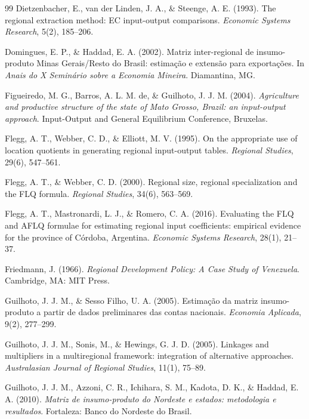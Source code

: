 \documentclass[11pt,a4paper]{article}
\begin{document}
\begin{thebibliography}{99}
Dietzenbacher, E., van der Linden, J. A., \& Steenge, A. E. (1993). The regional extraction
method: EC input-output comparisons. \textit{Economic Systems Research}, 5(2), 185--206.

Domingues, E. P., \& Haddad, E. A. (2002). Matriz inter-regional de insumo-produto
Minas Gerais/Resto do Brasil: estimação e extensão para exportações. In
\textit{Anais do X Seminário sobre a Economia Mineira}. Diamantina, MG.

Figueiredo, M. G., Barros, A. L. M. de, \& Guilhoto, J. J. M. (2004). \textit{Agriculture
and productive structure of the state of Mato Grosso, Brazil: an input-output approach}.
Input-Output and General Equilibrium Conference, Bruxelas.

Flegg, A. T., Webber, C. D., \& Elliott, M. V. (1995). On the appropriate use of location
quotients in generating regional input-output tables. \textit{Regional Studies}, 29(6), 547--561.

Flegg, A. T., \& Webber, C. D. (2000). Regional size, regional specialization and the FLQ
formula. \textit{Regional Studies}, 34(6), 563--569.

Flegg, A. T., Mastronardi, L. J., \& Romero, C. A. (2016). Evaluating the FLQ and AFLQ
formulae for estimating regional input coefficients: empirical evidence for the
province of Córdoba, Argentina. \textit{Economic Systems Research}, 28(1), 21--37.

Friedmann, J. (1966). \textit{Regional Development Policy: A Case Study of Venezuela}.
Cambridge, MA: MIT Press.

Guilhoto, J. J. M., \& Sesso Filho, U. A. (2005). Estimação da matriz
insumo-produto a partir de dados preliminares das contas nacionais.
\textit{Economia Aplicada}, 9(2), 277--299.

Guilhoto, J. J. M., Sonis, M., \& Hewings, G. J. D. (2005). Linkages and multipliers in a
multiregional framework: integration of alternative approaches. \textit{Australasian
Journal of Regional Studies}, 11(1), 75--89.

Guilhoto, J. J. M., Azzoni, C. R., Ichihara, S. M., Kadota, D. K., \& Haddad, E. A.
(2010). \textit{Matriz de insumo-produto do Nordeste e estados: metodologia e
resultados}. Fortaleza: Banco do Nordeste do Brasil.


\end{thebibliography}
\end{document}

